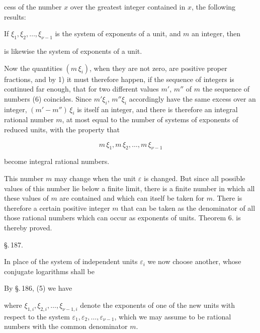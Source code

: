 cess of the number $x$ over the greatest integer contained in $x$,
the following results:

If $\xi_1, \xi_2, \ldots, \xi_{\nu-1}$ is the system of exponents of a unit, and
$m$ an integer, then


is likewise the system of exponents of a unit.

Now the quantities $(m\,\xi_i)$, when they are not zero, are
positive proper fractions, and by 1) it must therefore happen, if the
sequence of integers is continued far enough, that for two
different values $m'$, $m''$ of $m$ the sequence of numbers (6)
coincides. Since $m'\xi_i$, $m''\xi_i$ accordingly have the same
excess over an integer, $(m' - m'')\,\xi_i$ is itself an
integer, and there is therefore an integral rational
number $m$, at most equal to the number of systems of exponents
of reduced units, with the property that

\[
m\,\xi_1, m\,\xi_2, \ldots, m\,\xi_{\nu-1}
\]

become integral rational numbers.

This number $m$ may change when the unit $\varepsilon$ is
changed. But since all possible values of this number lie below a
finite limit, there is a finite number in which
all these values of $m$ are contained and which can itself be
taken for $m$. There is therefore a certain positive
integer $m$ that can be taken as the denominator of all those rational
 numbers which can occur as exponents of
 units. Theorem 6. is thereby proved.

\begin{center}
\S.\,187.\\[4pt]
\end{center}

In place of the system of independent units $\varepsilon_i$ we now
 choose another, whose conjugate logarithms shall be


By \S.\,186, (5) we have


where $\xi_{1,i}, \xi_{2,i}, \ldots, \xi_{\nu-1,i}$ denote the exponents of one of the new units
 with respect to the system $\varepsilon_1, \varepsilon_2, \ldots, \varepsilon_{\nu-1}$, which
we may assume to be rational numbers with the common denominator $m$.

